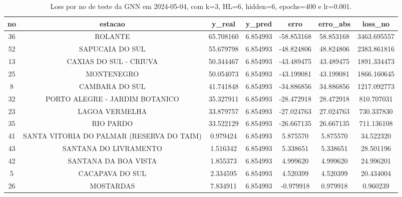 \begin{table}[h]
\centering
\caption{Loss por no de teste da GNN em 2024-05-04, com k=3, HL=6, hidden=6, epochs=400 e lr=0.001.}
\label{tab:gnn_loss_k3_hl6_h6_e400_d20240504}
\begin{tabular}{ccccccc}
\toprule
no & estacao & y\_real & y\_pred & erro & erro\_abs & loss\_no \\
\midrule
36 & ROLANTE & 65.708160 & 6.854993 & -58.853168 & 58.853168 & 3463.695557 \\
52 & SAPUCAIA DO SUL & 55.679798 & 6.854993 & -48.824806 & 48.824806 & 2383.861816 \\
13 & CAXIAS DO SUL - CRIUVA & 50.344467 & 6.854993 & -43.489475 & 43.489475 & 1891.334473 \\
25 & MONTENEGRO & 50.054073 & 6.854993 & -43.199081 & 43.199081 & 1866.160645 \\
8 & CAMBARA DO SUL & 41.741848 & 6.854993 & -34.886856 & 34.886856 & 1217.092773 \\
32 & PORTO ALEGRE - JARDIM BOTANICO & 35.327911 & 6.854993 & -28.472918 & 28.472918 & 810.707031 \\
23 & LAGOA VERMELHA & 33.879757 & 6.854993 & -27.024763 & 27.024763 & 730.337830 \\
35 & RIO PARDO & 33.522129 & 6.854993 & -26.667135 & 26.667135 & 711.136108 \\
41 & SANTA VITORIA DO PALMAR (RESERVA DO TAIM) & 0.979424 & 6.854993 & 5.875570 & 5.875570 & 34.522320 \\
43 & SANTANA DO LIVRAMENTO & 1.516342 & 6.854993 & 5.338651 & 5.338651 & 28.501196 \\
42 & SANTANA DA BOA VISTA & 1.855373 & 6.854993 & 4.999620 & 4.999620 & 24.996201 \\
5 & CACAPAVA DO SUL & 2.334595 & 6.854993 & 4.520399 & 4.520399 & 20.434004 \\
26 & MOSTARDAS & 7.834911 & 6.854993 & -0.979918 & 0.979918 & 0.960239 \\
\bottomrule
\end{tabular}
\end{table}
